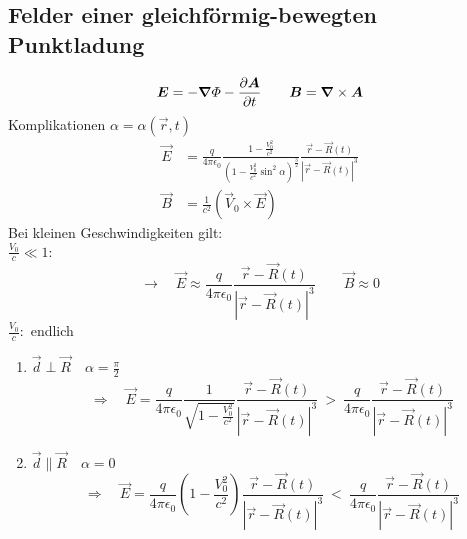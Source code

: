 \subsection{Felder einer gleichförmig-bewegten Punktladung}

\begin{equation*}
\bm{E} = - \bm{\nabla} \varPhi - \frac{\partial \bm{A}}{\partial t} \qquad \bm{B} = \bm{\nabla} \times \bm{A}
\end{equation*}
Komplikationen $ \alpha = \alpha(\vec{r},t) $
%
%
%
%
%
%
\begin{align*}
\vec{E} &= \frac{q}{4 \pi \epsilon_0} \frac{1 - \frac{V_0^2}{c^2}}{\left(1 - \frac{V_0^2}{c^2} \sin^2 \alpha\right)^{\frac{3}{2}}} \frac{\vec{r} - \vec{R}(t)}{|\vec{r} - \vec{R}(t)|^3}\\
\vec{B} &= \frac{1}{c^2} \left(\vec{V}_0 \times \vec{E}\right)
\end{align*}
Bei kleinen Geschwindigkeiten gilt:\\
$ \frac{V_0}{c} \ll 1 : $
\begin{equation*}
\rightarrow \quad \vec{E} \approx \frac{q}{4 \pi \epsilon_0} \frac{\vec{r} - \vec{R}(t)}{|\vec{r} - \vec{R}(t)|^3} \qquad \vec{B} \approx 0
\end{equation*}
$ \frac{V_0}{c} : $ endlich
%
%
%
%
%
%
\begin{enumerate}[1)]
	\item $ \vec{d} \perp \vec{R} \quad \alpha = \frac{\pi}{2} $
	\begin{equation*}
	\Rightarrow \quad \vec{E} = \frac{q}{4 \pi \epsilon_0} \frac{1}{\sqrt{1 - \frac{V_0^2}{c^2}}} \frac{\vec{r} - \vec{R}(t)}{|\vec{r} - \vec{R}(t)|^3} \ > \ \frac{q}{4 \pi \epsilon_0} \frac{\vec{r} - \vec{R}(t)}{|\vec{r} - \vec{R}(t)|^3}
	\end{equation*}
	\item $ \vec{d} \parallel \vec{R} \quad \alpha = 0 $
	\begin{equation*}
	\Rightarrow \quad \vec{E} = \frac{q}{4 \pi \epsilon_0} \left(1 - \frac{V_0^2}{c^2}\right) \frac{\vec{r} - \vec{R}(t)}{|\vec{r} - \vec{R}(t)|^3} \ < \ \frac{q}{4 \pi \epsilon_0} \frac{\vec{r} - \vec{R}(t)}{|\vec{r} - \vec{R}(t)|^3}
	\end{equation*}
\end{enumerate}

